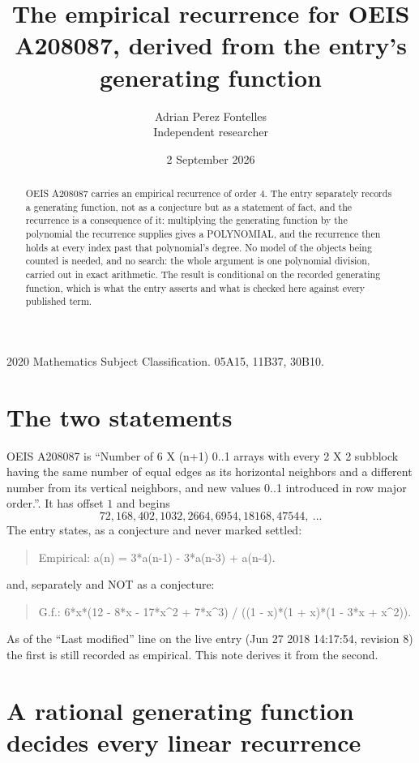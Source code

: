 \documentclass[11pt,a4paper]{article}
\title{The empirical recurrence for OEIS A208087, derived from the entry's generating function}
\author{Adrian Perez Fontelles\\ \small Independent researcher}
\date{2 September 2026}
\theoremstyle{plain}
\theoremstyle{definition}
\begin{document}
\maketitle

\begin{abstract}
OEIS A208087 carries an empirical recurrence of order $4$. The entry separately records a
generating function, not as a conjecture but as a statement of fact, and the recurrence is a
consequence of it: multiplying the generating function by the polynomial the recurrence
supplies gives a POLYNOMIAL, and the recurrence then holds at every index past that
polynomial's degree. No model of the objects being counted is needed, and no search: the
whole argument is one polynomial division, carried out in exact arithmetic. The result is
conditional on the recorded generating function, which is what the entry asserts and what is
checked here against every published term.
\end{abstract}

\noindent\small 2020 Mathematics Subject Classification. 05A15, 11B37, 30B10.\normalsize

\section{The two statements}

OEIS A208087 is ``Number of 6 X (n+1) 0..1 arrays with every 2 X 2 subblock having the same number of equal edges as its horizontal neighbors and a different number from its vertical neighbors, and new values 0..1 introduced in row major order.''. It has offset $1$ and begins
\[
72, 168, 402, 1032, 2664, 6954, 18168, 47544,\ \dots
\]
The entry states, as a conjecture and never marked settled:
\begin{quote}
Empirical: a(n) = 3*a(n-1) - 3*a(n-3) + a(n-4).
\end{quote}
and, separately and NOT as a conjecture:
\begin{quote}
G.f.: 6*x*(12 - 8*x - 17*x\^{}2 + 7*x\^{}3) / ((1 - x)*(1 + x)*(1 - 3*x + x\^{}2)).
\end{quote}
As of the ``Last modified'' line on the live entry (Jun 27 2018 14:17:54, revision 8) the first is still
recorded as empirical. This note derives it from the second.

\section{A rational generating function decides every linear recurrence}
\end{document}
